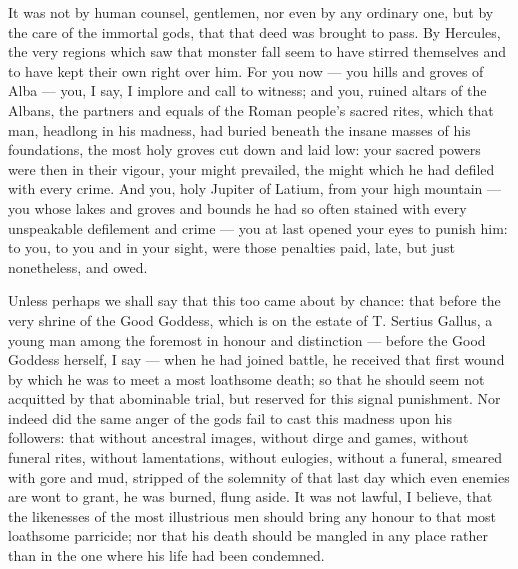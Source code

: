  It was not by human counsel, gentlemen, nor even by any ordinary one, but by the care of the immortal gods, that that deed was brought to pass. By Hercules, the very regions which saw that monster fall seem to have stirred themselves and to have kept their own right over him. For you now --- you hills and groves of Alba --- you, I say, I implore and call to witness; and you, ruined altars of the Albans, the partners and equals of the Roman people's sacred rites, which that man, headlong in his madness, had buried beneath the insane masses of his foundations, the most holy groves cut down and laid low: your sacred powers were then in their vigour, your might prevailed, the might which he had defiled with every crime. And you, holy Jupiter of Latium, from your high mountain --- you whose lakes and groves and bounds he had so often stained with every unspeakable defilement and crime --- you at last opened your eyes to punish him: to you, to you and in your sight, were those penalties paid, late, but just nonetheless, and owed.

 Unless perhaps we shall say that this too came about by chance: that before the very shrine of the Good Goddess, which is on the estate of T. Sertius Gallus, a young man among the foremost in honour and distinction --- before the Good Goddess herself, I say --- when he had joined battle, he received that first wound by which he was to meet a most loathsome death; so that he should seem not acquitted by that abominable trial, but reserved for this signal punishment. Nor indeed did the same anger of the gods fail to cast this madness upon his followers: that without ancestral images, without dirge and games, without funeral rites, without lamentations, without eulogies, without a funeral, smeared with gore and mud, stripped of the solemnity of that last day which even enemies are wont to grant, he was burned, flung aside. It was not lawful, I believe, that the likenesses of the most illustrious men should bring any honour to that most loathsome parricide; nor that his death should be mangled in any place rather than in the one where his life had been condemned.

